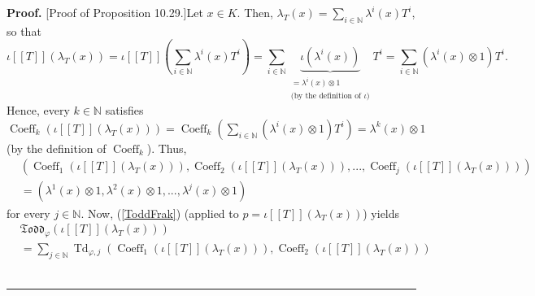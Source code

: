 \documentclass[numbers=enddot,12pt,final,onecolumn,notitlepage]{scrartcl}%
\newenvironment{proof}[1][Proof]{\noindent\textbf{#1.} }{\ \rule{0.5em}{0.5em}}
\begin{document}
\begin{proof}
[Proof of Proposition 10.29.]Let $x\in K$. Then, $\lambda_{T}\left(  x\right)
=\sum\limits_{i\in\mathbb{N}}\lambda^{i}\left(  x\right)  T^{i}$, so that%
\[
\iota\left[  \left[  T\right]  \right]  \left(  \lambda_{T}\left(  x\right)
\right)  =\iota\left[  \left[  T\right]  \right]  \left(  \sum\limits_{i\in
\mathbb{N}}\lambda^{i}\left(  x\right)  T^{i}\right)  =\sum\limits_{i\in
\mathbb{N}}\underbrace{\iota\left(  \lambda^{i}\left(  x\right)  \right)
}_{\substack{=\lambda^{i}\left(  x\right)  \otimes1\\\text{(by the definition
of }\iota\text{)}}}T^{i}=\sum\limits_{i\in\mathbb{N}}\left(  \lambda
^{i}\left(  x\right)  \otimes1\right)  T^{i}.
\]
Hence, every $k\in\mathbb{N}$ satisfies $\operatorname*{Coeff}\nolimits_{k}%
\left(  \iota\left[  \left[  T\right]  \right]  \left(  \lambda_{T}\left(
x\right)  \right)  \right)  =\operatorname*{Coeff}\nolimits_{k}\left(
\sum\limits_{i\in\mathbb{N}}\left(  \lambda^{i}\left(  x\right)
\otimes1\right)  T^{i}\right)  =\lambda^{k}\left(  x\right)  \otimes1$ (by the
definition of $\operatorname*{Coeff}\nolimits_{k}$). Thus,
\begin{align}
&  \left(  \operatorname*{Coeff}\nolimits_{1}\left(  \iota\left[  \left[
T\right]  \right]  \left(  \lambda_{T}\left(  x\right)  \right)  \right)
,\operatorname*{Coeff}\nolimits_{2}\left(  \iota\left[  \left[  T\right]
\right]  \left(  \lambda_{T}\left(  x\right)  \right)  \right)
,...,\operatorname*{Coeff}\nolimits_{j}\left(  \iota\left[  \left[  T\right]
\right]  \left(  \lambda_{T}\left(  x\right)  \right)  \right)  \right)
\nonumber\\
&  =\left(  \lambda^{1}\left(  x\right)  \otimes1,\lambda^{2}\left(  x\right)
\otimes1,...,\lambda^{j}\left(  x\right)  \otimes1\right)  \label{10.29.pf.1}%
\end{align}
for every $j\in\mathbb{N}$. Now, (\ref{ToddFrak}) (applied to $p=\iota\left[
\left[  T\right]  \right]  \left(  \lambda_{T}\left(  x\right)  \right)  $)
yields%
\begin{align*}
&  \mathfrak{Todd}_{\varphi}\left(  \iota\left[  \left[  T\right]  \right]
\left(  \lambda_{T}\left(  x\right)  \right)  \right) \\
&  =\sum\limits_{j\in\mathbb{N}}\operatorname*{Td}\nolimits_{\varphi,j}\left(
\operatorname*{Coeff}\nolimits_{1}\left(  \iota\left[  \left[  T\right]
\right]  \left(  \lambda_{T}\left(  x\right)  \right)  \right)
,\operatorname*{Coeff}\nolimits_{2}\left(  \iota\left[  \left[  T\right]
\right]  \left(  \lambda_{T}\left(  x\right)  \right)  \right)

\end{align*}
\end{proof}
\end{document}
